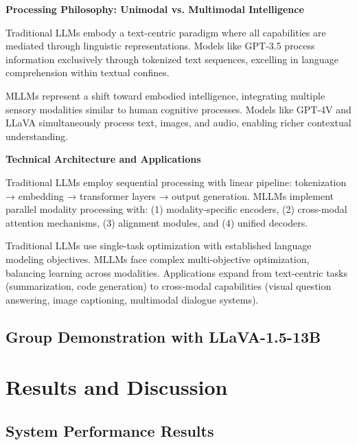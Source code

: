 \documentclass[12pt,a4paper]{article}
\begin{document}
\textbf{Processing Philosophy: Unimodal vs. Multimodal Intelligence}

Traditional LLMs embody a text-centric paradigm where all capabilities are mediated through linguistic representations. Models like GPT-3.5 process information exclusively through tokenized text sequences, excelling in language comprehension within textual confines.

MLLMs represent a shift toward embodied intelligence, integrating multiple sensory modalities similar to human cognitive processes. Models like GPT-4V and LLaVA simultaneously process text, images, and audio, enabling richer contextual understanding.

\textbf{Technical Architecture and Applications}

Traditional LLMs employ sequential processing with linear pipeline: tokenization → embedding → transformer layers → output generation. MLLMs implement parallel modality processing with: (1) modality-specific encoders, (2) cross-modal attention mechanisms, (3) alignment modules, and (4) unified decoders.

Traditional LLMs use single-task optimization with established language modeling objectives. MLLMs face complex multi-objective optimization, balancing learning across modalities. Applications expand from text-centric tasks (summarization, code generation) to cross-modal capabilities (visual question answering, image captioning, multimodal dialogue systems).


\subsection{Group Demonstration with LLaVA-1.5-13B}



\section{Results and Discussion}


\subsection{System Performance Results}

\end{document}
